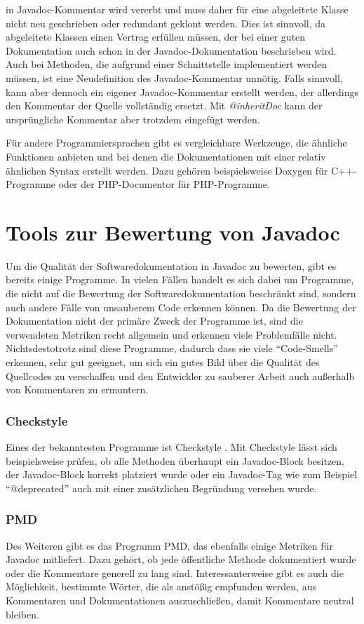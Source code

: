 in Javadoc-Kommentar wird vererbt und muss daher für eine abgeleitete Klasse nicht neu geschrieben oder redundant geklont werden. Dies ist sinnvoll, da abgeleitete Klassen einen Vertrag erfüllen müssen, der bei einer guten Dokumentation auch schon in der Javadoc-Dokumentation beschrieben wird. Auch bei Methoden, die aufgrund einer Schnittstelle implementiert werden müssen, ist eine Neudefinition des Javadoc-Kommentar unnötig. Falls sinnvoll, kann aber dennoch ein eigener Javadoc-Kommentar erstellt werden, der allerdings den Kommentar der Quelle vollständig ersetzt. Mit \textit{@inheritDoc} kann der ursprüngliche Kommentar aber trotzdem eingefügt werden.

Für andere Programmiersprachen gibt es vergleichbare Werkzeuge, die ähnliche Funktionen anbieten und bei denen die Dokumentationen mit einer relativ ähnlichen Syntax erstellt werden. Dazu gehören beispielsweise Doxygen für C++-Programme oder der PHP-Documentor für PHP-Programme. 
\section{Tools zur Bewertung von Javadoc}
Um die Qualität der Softwaredokumentation in Javadoc zu bewerten, gibt es bereits einige Programme. In vielen Fällen handelt es sich dabei um Programme, die nicht auf die Bewertung der Softwaredokumentation beschränkt sind, sondern auch andere Fälle von unsauberem Code erkennen können. Da die Bewertung der Dokumentation nicht der primäre Zweck der Programme ist, sind die verwendeten Metriken recht allgemein und erkennen viele Problemfälle nicht. Nichtsdestotrotz sind diese Programme, dadurch dass sie viele \enquote{Code-Smells} erkennen, sehr gut geeignet, um sich ein gutes Bild über die Qualität des Quellcodes zu verschaffen und den Entwickler zu sauberer Arbeit auch außerhalb von Kommentaren zu ermuntern.
\subsubsection{Checkstyle}
Eines der bekanntesten Programme ist Checkstyle \cite{Checkstyle}. Mit Checkstyle lässt sich beispielsweise prüfen, ob alle Methoden überhaupt ein Javadoc-Block besitzen, der Javadoc-Block korrekt platziert wurde oder ein Javadoc-Tag wie zum Beispiel \enquote{@deprecated} auch mit einer zusätzlichen Begründung versehen wurde. 
\subsubsection{PMD}
Des Weiteren gibt es das Programm PMD\cite{PMD}, das ebenfalls einige Metriken für Javadoc mitliefert. Dazu gehört, ob jede öffentliche Methode dokumentiert wurde oder die Kommentare generell zu lang sind. Interessanterweise gibt es auch die Möglichkeit, bestimmte Wörter, die als anstößig empfunden werden, aus Kommentaren und Dokumentationen auszuschließen, damit Kommentare neutral bleiben. 
